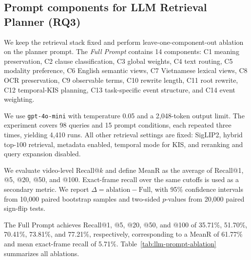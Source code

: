 \documentclass[runningheads]{llncs}
\begin{document}



\subsection{Prompt components for LLM Retrieval Planner (RQ3)}
\label{subsec:llm-prompt-component-ablation}

We keep the retrieval stack fixed and perform leave-one-component-out ablation on the planner prompt. The \emph{Full Prompt} contains 14 components: C1 meaning preservation, C2 clause classification, C3 global weights, C4 text routing, C5 modality preference, C6 English semantic views, C7 Vietnamese lexical views, C8 OCR preservation, C9 observable terms, C10 rewrite length, C11 root rewrite, C12 temporal-KIS planning, C13 task-specific event structure, and C14 event weighting.

We use \texttt{gpt-4o-mini} with temperature 0.05 and a 2,048-token output limit. The experiment covers 98 queries and 15 prompt conditions, each repeated three times, yielding 4,410 runs. All other retrieval settings are fixed: SigLIP2, hybrid top-$100$ retrieval, metadata enabled, temporal mode for KIS, and reranking and query expansion disabled.

We evaluate video-level Recall@$k$ and define MeanR as the average of Recall@1, @5, @20, @50, and @100. Exact-frame recall over the same cutoffs is used as a secondary metric. We report $\Delta=\text{ablation}-\text{Full}$, with 95\% confidence intervals from 10,000 paired bootstrap samples and two-sided $p$-values from 20,000 paired sign-flip tests.

The Full Prompt achieves Recall@1, @5, @20, @50, and @100 of 35.71\%, 51.70\%, 70.41\%, 73.81\%, and 77.21\%, respectively, corresponding to a MeanR of 61.77\% and mean exact-frame recall of 5.71\%. Table~\ref{tab:llm-prompt-ablation} summarizes all ablations.
\end{document}
